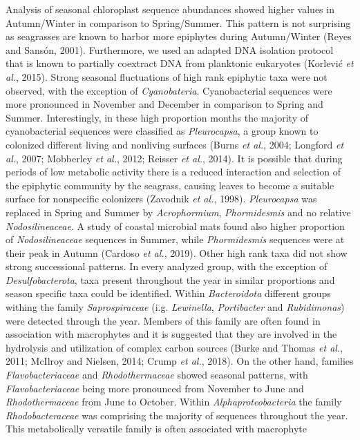 \documentclass[12pt,]{article}
\begin{document}
Analysis of seasonal chloroplast sequence abundances showed higher
values in Autumn/Winter in comparison to Spring/Summer. This pattern is
not surprising as seagrasses are known to harbor more epiphytes during
Autumn/Winter (Reyes and Sansón, 2001). Furthermore, we used an adapted
DNA isolation protocol that is known to partially coextract DNA from
planktonic eukaryotes (Korlević \emph{et al.}, 2015). Strong seasonal
fluctuations of high rank epiphytic taxa were not observed, with the
exception of \emph{Cyanobateria}. Cyanobacterial sequences were more
pronounced in November and December in comparison to Spring and Summer.
Interestingly, in these high proportion months the majority of
cyanobacterial sequences were classified as \emph{Pleurocapsa}, a group
known to colonized different living and nonliving surfaces (Burns
\emph{et al.}, 2004; Longford \emph{et al.}, 2007; Mobberley \emph{et
al.}, 2012; Reisser \emph{et al.}, 2014). It is possible that during
periods of low metabolic activity there is a reduced interaction and
selection of the epiphytic community by the seagrass, causing leaves to
become a suitable surface for nonspecific colonizers (Zavodnik \emph{et
al.}, 1998). \emph{Pleurocapsa} was replaced in Spring and Summer by
\emph{Acrophormium}, \emph{Phormidesmis} and no relative
\emph{Nodosilineaceae}. A study of coastal microbial mats found also
higher proportion of \emph{Nodosilineaceae} sequences in Summer, while
\emph{Phormidesmis} sequences were at their peak in Autumn (Cardoso
\emph{et al.}, 2019). Other high rank taxa did not show strong
successional patterns. In every analyzed group, with the exception of
\emph{Desulfobacterota}, taxa present throughout the year in similar
proportions and season specific taxa could be identified. Within
\emph{Bacteroidota} different groups withing the family
\emph{Saprospiraceae} (i.g. \emph{Lewinella}, \emph{Portibacter} and
\emph{Rubidimonas}) were detected through the year. Members of this
family are often found in association with macrophytes and it is
suggested that they are involved in the hydrolysis and utilization of
complex carbon sources (Burke and Thomas \emph{et al.}, 2011; McIlroy
and Nielsen, 2014; Crump \emph{et al.}, 2018). On the other hand,
families \emph{Flavobacteriaceae} and \emph{Rhodothermaceae} showed
seasonal patterns, with \emph{Flavobacteriaceae} being more pronounced
from November to June and \emph{Rhodothermaceae} from June to October.
Within \emph{Alphaproteobacteria} the family \emph{Rhodobacteraceae} was
comprising the majority of sequences throughout the year. This
metabolically versatile family is often associated with macrophyte
\end{document}
